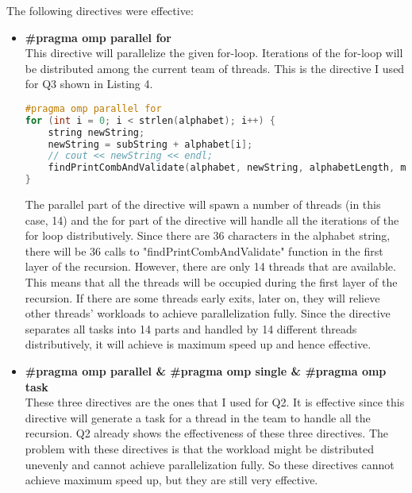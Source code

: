 \documentclass[12pt]{article}
\begin{document}
\noindent
The following directives were effective:
\begin{itemize}
  \item \textbf{\#pragma omp parallel for} \\
  This directive will parallelize the given for-loop. Iterations of the for-loop will be distributed among the current team of threads. This is the directive I used for Q3 shown in Listing 4. 
  \begin{lstlisting}[language=c, caption=Manual Parallelization with OpenMP]
#pragma omp parallel for
for (int i = 0; i < strlen(alphabet); i++) { 
    string newString; 
    newString = subString + alphabet[i]; 
    // cout << newString << endl;
    findPrintCombAndValidate(alphabet, newString, alphabetLength, message, origSig); 
} 
 \end{lstlisting}
The parallel part of the directive will spawn a number of threads (in this case, 14) and the for part of the directive will handle all the iterations of the for loop distributively. Since there are 36 characters in the alphabet string, there will be 36 calls to "findPrintCombAndValidate" function in the first layer of the recursion. However, there are only 14 threads that are available. This means that all the threads will be occupied during the first layer of the recursion. If there are some threads early exits, later on, they will relieve other threads' workloads to achieve parallelization fully. Since the directive separates all tasks into 14 parts and handled by 14 different threads distributively, it will achieve is maximum speed up and hence effective. 
  
  \item \textbf{\#pragma omp parallel \& \#pragma omp single \& \#pragma omp task}\\
  These three directives are the ones that I used for Q2. It is effective since this directive will generate a task for a thread in the team to handle all the recursion. Q2 already shows the effectiveness of these three directives. The problem with these directives is that the workload might be distributed unevenly and cannot achieve parallelization fully. So these directives cannot achieve maximum speed up, but they are still very effective. 
\end{itemize}
\end{document}

